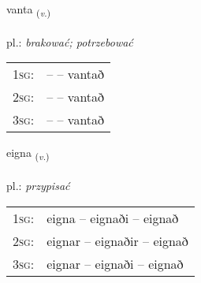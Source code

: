 \documentclass[frontgrid, backgrid]{flacards}\usepackage[]{graphicx}\usepackage[]{xcolor}
\begin{document}
\renewcommand{\flhead}{\vskip5pt \fboxsep=0pt {\small\bfseries\footnotesize Sagnorð | Verb}}
\renewcommand{\fcfoot}{\vskip5pt \fboxsep=0pt \hspace{2pt}{\small\bfseries\footnotesize 1K}}

\renewcommand{\blhead}{\vskip5pt {\small\bfseries\footnotesize Sagnorð | Verb }}
\renewcommand{\bcfoot}{\vskip5pt \hspace{2pt}{\small\bfseries\footnotesize 1K}}


{vanta \small{\textsubscript{(\textit{v.})}} \\[1ex] %
\textphonetic{[van̥ta]} \\
pl.: \emph{brakować; potrzebować} \\  [2ex]
\renewcommand*{\arraystretch}{0.8}
\begin{tabular}{p{1cm}l}
\textsc{1sg}: &  --  -- vantað \\ 
\textsc{2sg}: &  --  -- vantað \\ 
\textsc{3sg}: &  --  -- vantað \\ 
\end{tabular}
}

\renewcommand{\flhead}{\vskip5pt \fboxsep=0pt {\small\bfseries\footnotesize Sagnorð | Verb}}
\renewcommand{\fcfoot}{\vskip5pt \fboxsep=0pt \hspace{2pt}{\small\bfseries\footnotesize 1K}}

\renewcommand{\blhead}{\vskip5pt {\small\bfseries\footnotesize Sagnorð | Verb }}
\renewcommand{\bcfoot}{\vskip5pt \hspace{2pt}{\small\bfseries\footnotesize 1K}}


{eigna \small{\textsubscript{(\textit{v.})}} \\[1ex] %
\textphonetic{[eikna]} \\
pl.: \emph{przypisać} \\  [2ex]
\renewcommand*{\arraystretch}{0.8}
\begin{tabular}{p{1cm}l}
\textsc{1sg}: & eigna -- eignaði -- eignað \\ 
\textsc{2sg}: & eignar -- eignaðir -- eignað \\ 
\textsc{3sg}: & eignar -- eignaði -- eignað \\ 
\end{tabular}
}
\end{document}
